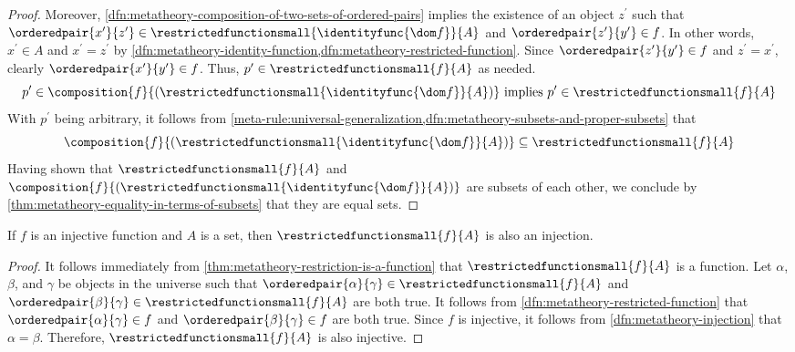 \begin{proof}
    Moreover, \cref{dfn:metatheory-composition-of-two-sets-of-ordered-pairs} implies the existence of an object \( z^{\prime} \)
    such that \( \orderedpair{x^{\prime}}{z^{\prime}} \in \restrictedfunctionsmall{ \identityfunc{ \dom f } }{A} \)
    and \( \orderedpair{z^{\prime}}{y^{\prime}} \in f \).
    In other words, \( x^{\prime} \in A \) and \( x^{\prime} = z^{\prime} \) by \cref{dfn:metatheory-identity-function,dfn:metatheory-restricted-function}.
    Since \( \orderedpair{z^{\prime}}{y^{\prime}} \in f \) and \( z^{\prime} = x^{\prime} \), clearly
    \( \orderedpair{x^{\prime}}{y^{\prime}} \in f \).
    Thus, \( p^{\prime} \in \restrictedfunctionsmall{f}{A} \) as needed.
    \begin{equation*}
        p^{\prime} \in \composition{ f }{ \mleft( \restrictedfunctionsmall{ \identityfunc{\dom f} }{A} \mright) } \ \text{implies}
        \ p^{\prime} \in \restrictedfunctionsmall{f}{A}
    \end{equation*}
    With \( p^{\prime} \) being arbitrary, it follows from \cref{meta-rule:universal-generalization,dfn:metatheory-subsets-and-proper-subsets} that
    \begin{equation*}
        \composition{ f }{ \mleft( \restrictedfunctionsmall{ \identityfunc{\dom f} }{A} \mright) } \subseteq \restrictedfunctionsmall{f}{A}
    \end{equation*}
    Having shown that \( \restrictedfunctionsmall{f}{A} \) and \( \composition{ f }{ \mleft(  \restrictedfunctionsmall{ \identityfunc{\dom f} }{A} \mright) } \)
    are subsets of each other, we conclude by \cref{thm:metatheory-equality-in-terms-of-subsets} that they are equal sets.
\end{proof}

\begin{thm}
     \label{thm:metatheory-the-restriction-of-an-injection-is-also-an-injection}
    If \( f \) is an injective function and \( A \) is a set, then \( \restrictedfunctionsmall{f}{A} \) is also an injection.
\end{thm}

\begin{proof}
    It follows immediately from \cref{thm:metatheory-restriction-is-a-function} that \( \restrictedfunctionsmall{f}{A} \) is a function.
    Let \( \alpha \), \( \beta \), and \( \gamma \) be objects in the universe such that
    \( \orderedpair{\alpha}{\gamma} \in \restrictedfunctionsmall{f}{A} \) and \( \orderedpair{\beta}{\gamma} \in \restrictedfunctionsmall{f}{A} \)
    are both true.
    It follows from \cref{dfn:metatheory-restricted-function} that \( \orderedpair{\alpha}{\gamma} \in f \) and \( \orderedpair{\beta}{\gamma} \in f \)
    are both true.
    Since \( f \) is injective, it follows from \cref{dfn:metatheory-injection} that \( \alpha = \beta \).
    Therefore, \( \restrictedfunctionsmall{f}{A} \) is also injective.
\end{proof}

